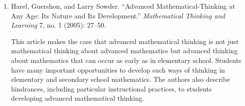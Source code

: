 {{\begin{enumerate}
          \par\noindent\hspace*{1em} The author defines and discusses research on statistical reasoning. She also describes a developmental model portraying five stages of statistical reasoning for students. In addition, she considers implications for assessment and teaching.\vspace{.35\baselineskip}

        \item Harel, Guershon, and Larry Sowder. ``Advanced Mathematical-Thinking at Any Age: Its Nature and Its Development.'' \emph{Mathematical Thinking and Learning} 7, no. 1 (2005): 27--50.\vspace{.25\baselineskip}

          \par\noindent\hspace*{1em} This article makes the case that advanced mathematical thinking is not just mathematical thinking about advanced mathematics but advanced thinking about mathematics that can occur as early as in elementary school. Students have many important opportunities to develop such ways of thinking in elementary and secondary school mathematics. The authors also describe hindrances, including particular instructional practices, to students developing advanced mathematical thinking.
      \end{enumerate}}
  }
